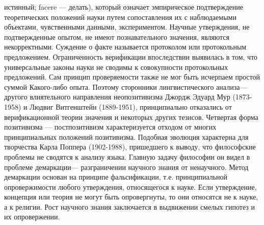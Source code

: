 \documentclass[12pt]{article}
\begin{document}
истинный; facere — делать), который означает эмпирическое подтверждение теоретических положений науки
путем сопоставления их с наблюдаемыми объектами, чувственными данными, экспериментом. Научные
утверждения, не подтвержденные опытом, не имеют познавательного значения, являются некорректными. 
Суждение о факте называется протоколом или протокольным предложением. Ограниченность верификации
впоследствии выявилась в том, что универсальные законы науки не сводимы к совокупности протокольных
предложений. Сам принцип проверяемости также не мог быть исчерпаем простой суммой Какого-либо опыта.
Поэтому сторонники лингвистического анализа—другого влиятельного направления неопозитивизма Джордж
Эдуард Мур (1873-1958) и Людвиг Витгенштейн (1889-1951), принципиально отказались от верификационной
теории значения и некоторых других тезисов.
Четвертая форма позитивизма — постпозитивизм характеризуется отходом от многих принципиальных
положений позитивизма. Подобная эволюция характерна для творчества Карла Поппера (1902-1988),
пришедшего к выводу, что философские проблемы не сводятся к анализу языка. Главную задачу философии он
видел в проблеме демаркации— разграничении научного знания от ненаучного. Метод демаркации основан на
принципе фальсификации, т.е. принципиальной опровержимости любого утверждения, относящегося к науке.
Если утверждение, концепция или теория не могут быть опровергнуты, то они относятся не к науке, а к
религии. Рост научного знания заключается в выдвижении смелых гипотез и их опровержении.


\newpage
\end{document}
